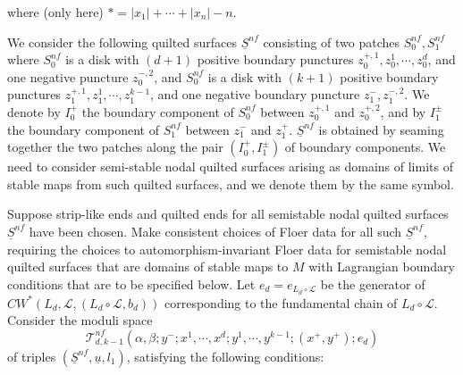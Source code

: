 \documentclass{amsart}
\numberwithin{equation}{section}
\numberwithin{figure}{section}
\begin{document}
where (only here) $* = |x_{1}| + \cdots + |x_{n}| - n$. \par
	We consider the following quilted surfaces $\underline{S}^{nf}$ consisting of two patches $S^{nf}_{0}, S^{nf}_{1}$ where $S^{nf}_{0}$ is a disk with $(d+1)$ positive boundary punctures $z_{0}^{+, 1}, z_{0}^{1}, \cdots, z_{0}^{d}$, and one negative puncture $z_{0}^{-, 2}$, and $S^{nf}_{0}$ is a disk with $(k+1)$ positive boundary punctures $z_{1}^{+, 1}, z_{1}^{1}, \cdots, z_{1}^{k-1}$, and one negative boundary puncture $z_{1}^{-}, z_{1}^{-,2}$. We denote by $I_{0}^{+}$ the boundary component of $S^{nf}_{0}$ between $z_{0}^{+, 1}$ and $z_{0}^{+, 2}$, and by $I_{1}^{\pm}$ the boundary component of $S^{nf}_{1}$ between $z_{1}^{-}$ and $z_{1}^{+}$. $\underline{S}^{nf}$ is obtained by seaming together the two patches along the pair $(I_{0}^{+}, I_{1}^{\pm})$ of boundary components. We need to consider semi-stable nodal quilted surfaces arising as domains of limits of stable maps from such quilted surfaces, and we denote them by the same symbol. \par
	Suppose strip-like ends and quilted ends for all semistable nodal quilted surfaces $\underline{S}^{nf}$ have been chosen. Make consistent choices of Floer data for all such $\underline{S}^{nf}$, requiring the choices to automorphism-invariant Floer data for semistable nodal quilted surfaces that are domains of stable maps to $M$ with Lagrangian boundary conditions that are to be specified below. Let $e_{d} = e_{L_{d} \circ \mathcal{L}}$ be the generator of $CW^{*}(L_{d}, \mathcal{L}, (L_{d} \circ \mathcal{L}, b_{d}))$ corresponding to the fundamental chain of $L_{d} \circ \mathcal{L}$. Consider the moduli space 
\begin{equation}
\mathcal{T}^{nf}_{d, k-1}(\alpha, \beta; y^{-}; x^{1}, \cdots, x^{d}; y^{1}, \cdots, y^{k-1}; (x^{+}, y^{+}); e_{d})
\end{equation}
of triples $(\underline{S}^{nf}, \underline{u}, l_{1})$, satisfying the following conditions:
\end{document}

